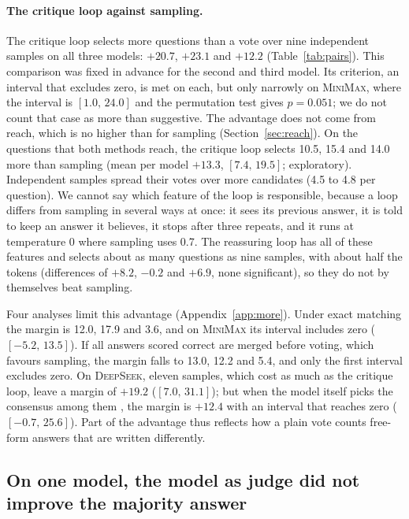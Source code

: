 \documentclass[11pt]{article}
\newcommand{\ds}{\textsc{DeepSeek}}
\newcommand{\mm}{\textsc{MiniMax}}
\newcommand{\ci}[2]{$[#1,\,#2]$}
\begin{document}
\paragraph{The critique loop against sampling.}
The critique loop selects more questions than a vote over nine independent samples on all three models: $+20.7$, $+23.1$ and $+12.2$ (Table~\ref{tab:pairs}).
This comparison was fixed in advance for the second and third model.
Its criterion, an interval that excludes zero, is met on each, but only narrowly on \mm{}, where the interval is \ci{1.0}{24.0} and the permutation test gives $p=0.051$; we do not count that case as more than suggestive.
The advantage does not come from reach, which is no higher than for sampling (Section~\ref{sec:reach}).
On the questions that both methods reach, the critique loop selects 10.5, 15.4 and 14.0 more than sampling (mean per model $+13.3$, \ci{7.4}{19.5}; exploratory).
Independent samples spread their votes over more candidates (4.5 to 4.8 per question).
We cannot say which feature of the loop is responsible, because a loop differs from sampling in several ways at once: it sees its previous answer, it is told to keep an answer it believes, it stops after three repeats, and it runs at temperature 0 where sampling uses 0.7.
The reassuring loop has all of these features and selects about as many questions as nine samples, with about half the tokens (differences of $+8.2$, $-0.2$ and $+6.9$, none significant), so they do not by themselves beat sampling.

Four analyses limit this advantage (Appendix~\ref{app:more}).
Under exact matching the margin is 12.0, 17.9 and 3.6, and on \mm{} its interval includes zero (\ci{-5.2}{13.5}).
If all answers scored correct are merged before voting, which favours sampling, the margin falls to 13.0, 12.2 and 5.4, and only the first interval excludes zero.
On \ds, eleven samples, which cost as much as the critique loop, leave a margin of $+19.2$ (\ci{7.0}{31.1}); but when the model itself picks the consensus among them \citep{chen2023usc}, the margin is $+12.4$ with an interval that reaches zero (\ci{-0.7}{25.6}).
Part of the advantage thus reflects how a plain vote counts free-form answers that are written differently.

\subsection{On one model, the model as judge did not improve the majority answer}
\label{sec:judges}
\end{document}
